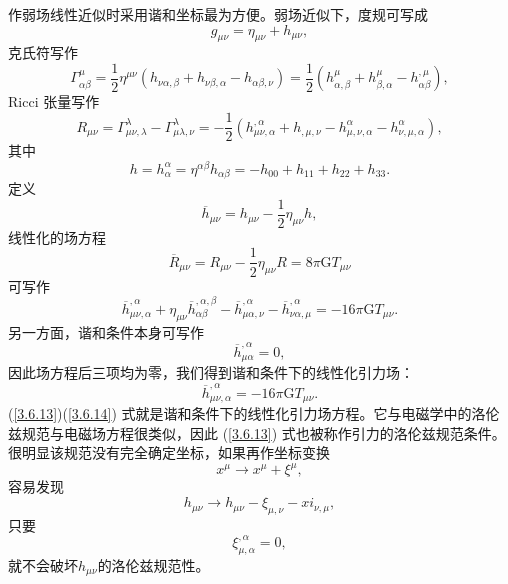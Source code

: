 \documentclass[11pt, a4paper, oneside, onecolumn]{ctexart}
\numberwithin{equation}{subsection}
\begin{document}
作弱场线性近似时采用谐和坐标最为方便。弱场近似下，度规可写成
\begin{equation}
g_{\mu\nu}=\eta_{\mu\nu}+h_{\mu\nu},
\end{equation}
克氏符写作
\begin{equation}
\Gamma_{\alpha\beta}^{\mu}=\frac12\eta^{\mu\nu}\left(h_{\nu\alpha,\beta}+h_{\nu\beta,\alpha}-h_{\alpha\beta,\nu}\right)=\frac12\left(h_{\alpha,\beta}^{\mu}+h_{\beta,\alpha}^{\mu}-h_{\alpha\beta}^{,\mu}\right),
\end{equation}
Ricci 张量写作
\begin{equation}
R_{\mu\nu}=\Gamma_{\mu\nu,\lambda}^{\lambda}-\Gamma_{\mu\lambda,\nu}^{\lambda}=-\frac{1}{2}\left(h_{\mu\nu,\alpha}^{,\alpha}+h_{,\mu,\nu}-h_{\mu,\nu,\alpha}^{\alpha}-h_{\nu,\mu,\alpha}^{\alpha}\right),
\end{equation}
其中
\begin{equation}
h=h^{\alpha}_{\alpha}=\eta^{\alpha\beta}h_{\alpha\beta}=-h_{00}+h_{11}+h_{22}+h_{33}.
\end{equation}
定义
\begin{equation}
\overline{h}_{\mu\nu}=h_{\mu\nu}-\frac12\eta_{\mu\nu}h,
\end{equation}
线性化的场方程
\begin{equation}
\overline{R}_{\mu\nu}=R_{\mu\nu}-\frac{1}{2}\eta_{\mu\nu}R=8\pi\mathrm{G}T_{\mu\nu}
\end{equation}
可写作
\begin{equation}
\overline{h}_{\mu\nu,\alpha}^{,\alpha}+\eta_{\mu\nu}\overline{h}_{\alpha\beta}^{,\alpha,\beta}-\overline{h}_{\mu\alpha,\nu}^{,\alpha}-\overline{h}_{\nu\alpha,\mu}^{,\alpha}=-16\pi\mathrm{G}T_{\mu\nu}.
\end{equation}
另一方面，谐和条件本身可写作
\begin{equation}
\overline{h}_{\mu\alpha}^{,\alpha}=0,\label{3.6.13}
\end{equation}
因此场方程后三项均为零，我们得到谐和条件下的线性化引力场：
\begin{equation}
\overline{h}_{\mu\nu,\alpha}^{,\alpha}=-16\pi\mathrm{G}T_{\mu\nu}.\label{3.6.14}
\end{equation}
(\ref{3.6.13})(\ref{3.6.14}) 式就是谐和条件下的线性化引力场方程。它与电磁学中的洛伦兹规范与电磁场方程很类似，因此 (\ref{3.6.13}) 式也被称作引力的洛伦兹规范条件。很明显该规范没有完全确定坐标，如果再作坐标变换
\begin{equation}
x^{\mu}\to x^{\mu}+\xi^{\mu},
\end{equation}
容易发现
\begin{equation}
h_{\mu\nu}\to h_{\mu\nu}-\xi_{\mu,\nu}-xi_{\nu,\mu},
\end{equation}
只要
\begin{equation}
\xi^{,\alpha}_{\mu,\alpha}=0,\label{3.6.17}
\end{equation}
就不会破坏$h_{\mu\nu}$的洛伦兹规范性。
\end{document}
